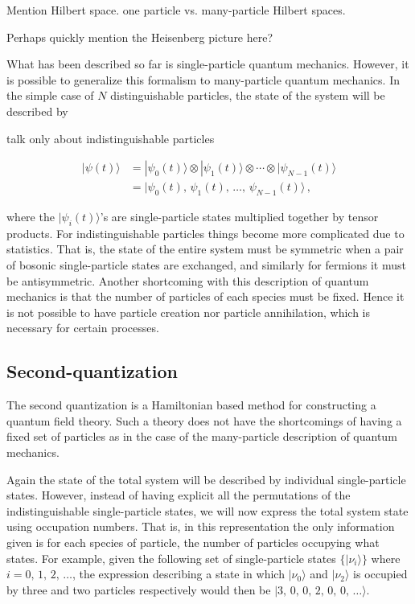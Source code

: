 \documentclass[12pt]{report}
\newcommand{\todo}[1]{{\leavevmode\color{todo}#1}}
\begin{document}
\todo{Mention Hilbert space. one particle vs. many-particle Hilbert spaces.}

\todo{Perhaps quickly mention the Heisenberg picture here?}


What has been described so far is single-particle quantum mechanics. However, it is possible to generalize this formalism to many-particle quantum mechanics. In the simple case of $ N $ distinguishable particles, the state of the system will be described by

\todo{talk only about indistinguishable particles}

\begin{equation}
	\begin{split}
		| \psi (t) \rangle
		&= | \psi_0 (t) \rangle \otimes | \psi_1 (t) \rangle \otimes \cdots \otimes | \psi_{N - 1} (t) \rangle \\
		&= | \psi_0 (t), \, \psi_1 (t), \, \dots,  \, \psi_{N-1}(t) \rangle \,,
	\end{split}
\end{equation}

where the $ | \psi_i (t) \rangle $'s are single-particle states multiplied together by tensor products. For indistinguishable particles things become more complicated due to statistics. That is, the state of the entire system must be symmetric when a pair of bosonic single-particle states are exchanged, and similarly for fermions it must be antisymmetric. Another shortcoming with this description of quantum mechanics is that the number of particles of each species must be fixed. Hence it is not possible to have particle creation nor particle annihilation, which is necessary for certain processes.

\subsection{Second-quantization}

The second quantization is a Hamiltonian based method for constructing a quantum field theory. Such a theory does not have the shortcomings of having a fixed set of particles as in the case of the many-particle description of quantum mechanics.

Again the state of the total system will be described by individual single-particle states. However, instead of having explicit all the permutations of the indistinguishable single-particle states, we will now express the total system state using occupation numbers. That is, in this representation the only information given is for each species of particle, the number of particles occupying what states. For example, given the following set of single-particle states $ \{ | \nu_i \rangle \} $ where $ i = 0, \, 1, \, 2, \, \dots $, the expression describing a state in which $ | \nu_0 \rangle $ and $ | \nu_2 \rangle $ is occupied by three and two particles respectively would then be $ |3, \, 0, \, 0, \, 2, \, 0, \, 0, \, \dots \rangle $.
\end{document}
